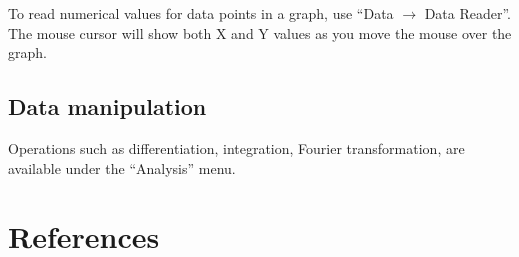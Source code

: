 \documentclass[byrevtex,amssymb,aps,pra,floatfix,letterpaper]{revtex4}
\begin{document}
To read numerical values for data points in a graph, use ``Data $\rightarrow$ Data Reader''. The mouse cursor will show both X and Y values as you move the mouse over the graph.

\subsection{Data manipulation}

Operations such as differentiation, integration, Fourier transformation, are available under the ``Analysis'' menu.

\section{References}

\vspace{-1cm}


\end{document}
